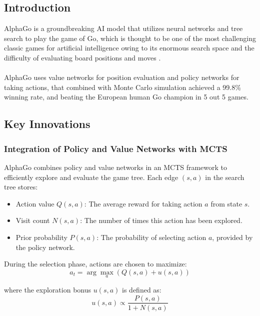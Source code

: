 \subsection{Introduction}
AlphaGo is a groundbreaking AI model that utilizes neural networks and tree
search to play the game of Go, which is thought to be one of the most
challenging classic games for artificial intelligence owing to its enormous
search space and the difficulty of evaluating board positions and moves
\cite{Silver2016}. \\\\ AlphaGo uses value networks for position evaluation and
policy networks for taking actions, that combined with Monte Carlo simulation
achieved a 99.8\% winning rate, and beating the European human Go champion in 5
out 5 games.

\subsection{Key Innovations}

\subsubsection*{Integration of Policy and Value Networks with MCTS}
AlphaGo combines policy and value networks in an MCTS framework to efficiently explore and evaluate the game tree. Each edge \( (s, a) \) in the search tree stores:
\begin{itemize}
    \item Action value \( Q(s, a) \): The average reward for taking action \( a \) from
          state \( s \).
    \item Visit count \( N(s, a) \): The number of times this action has been explored.
    \item Prior probability \( P(s, a) \): The probability of selecting action \( a \),
          provided by the policy network.
\end{itemize}

During the selection phase, actions are chosen to maximize:
\begin{equation}
    a_t = \arg\max_a \left( Q(s, a) + u(s, a) \right)
\end{equation}

where the exploration bonus \( u(s, a) \) is defined as:
\begin{equation}
    u(s, a) \propto \frac{P(s, a)}{1 + N(s, a)}
\end{equation}

